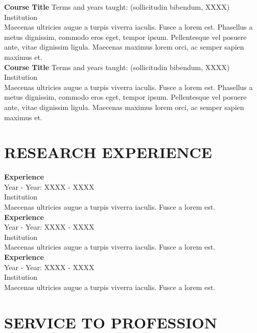 \documentclass[a4paper,9pt]{extarticle}
\begin{document}
\noindent
\textbf{Course Title} \hfill Terms and years taught: (sollicitudin bibendum, XXXX)\\
Institution\\
Maecenas ultricies augue a turpis viverra iaculis. Fusce a lorem est. Phasellus a metus dignissim, commodo eros eget, tempor ipsum. Pellentesque vel posuere ante, vitae dignissim ligula. Maecenas maximus lorem orci, ac semper sapien maximus et. \\

\noindent
\textbf{Course Title} \hfill Terms and years taught: (sollicitudin bibendum, XXXX)\\
Institution\\
Maecenas ultricies augue a turpis viverra iaculis. Fusce a lorem est. Phasellus a metus dignissim, commodo eros eget, tempor ipsum. Pellentesque vel posuere ante, vitae dignissim ligula. Maecenas maximus lorem orci, ac semper sapien maximus et. 


\section*{RESEARCH EXPERIENCE}

\noindent
\newline
\textbf{Experience} \\
Year - Year: XXXX - XXXX \\
Institution\\
Maecenas ultricies augue a turpis viverra iaculis. Fusce a lorem est. \\

\noindent
\textbf{Experience} \\
Year - Year: XXXX - XXXX \\
Institution\\
Maecenas ultricies augue a turpis viverra iaculis. Fusce a lorem est. \\

\noindent
\textbf{Experience} \\
Year - Year: XXXX - XXXX \\
Institution\\
Maecenas ultricies augue a turpis viverra iaculis. Fusce a lorem est.


\section*{SERVICE TO PROFESSION}
\end{document}
